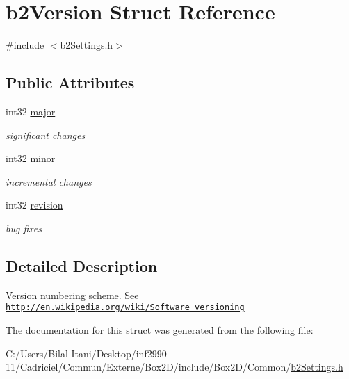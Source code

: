 \hypertarget{structb2_version}{}\section{b2\+Version Struct Reference}
\label{structb2_version}


{\ttfamily \#include $<$b2\+Settings.\+h$>$}

\subsection*{Public Attributes}
\begin{DoxyCompactItemize}
\item 
int32 \hyperlink{structb2_version_a720da8e346364d1cb34d176125380b44}{major}\hypertarget{structb2_version_a720da8e346364d1cb34d176125380b44}{}\label{structb2_version_a720da8e346364d1cb34d176125380b44}

\begin{DoxyCompactList}\small\item\em significant changes \end{DoxyCompactList}\item 
int32 \hyperlink{structb2_version_a115b8797a6e0b8e53f54502bd20d89da}{minor}\hypertarget{structb2_version_a115b8797a6e0b8e53f54502bd20d89da}{}\label{structb2_version_a115b8797a6e0b8e53f54502bd20d89da}

\begin{DoxyCompactList}\small\item\em incremental changes \end{DoxyCompactList}\item 
int32 \hyperlink{structb2_version_a395cfe1434e348115d2ead3d72b88847}{revision}\hypertarget{structb2_version_a395cfe1434e348115d2ead3d72b88847}{}\label{structb2_version_a395cfe1434e348115d2ead3d72b88847}

\begin{DoxyCompactList}\small\item\em bug fixes \end{DoxyCompactList}\end{DoxyCompactItemize}


\subsection{Detailed Description}
Version numbering scheme. See \href{http://en.wikipedia.org/wiki/Software_versioning}{\tt http\+://en.\+wikipedia.\+org/wiki/\+Software\+\_\+versioning} 

The documentation for this struct was generated from the following file\+:\begin{DoxyCompactItemize}
\item 
C\+:/\+Users/\+Bilal Itani/\+Desktop/inf2990-\/11/\+Cadriciel/\+Commun/\+Externe/\+Box2\+D/include/\+Box2\+D/\+Common/\hyperlink{b2_settings_8h}{b2\+Settings.\+h}\end{DoxyCompactItemize}
